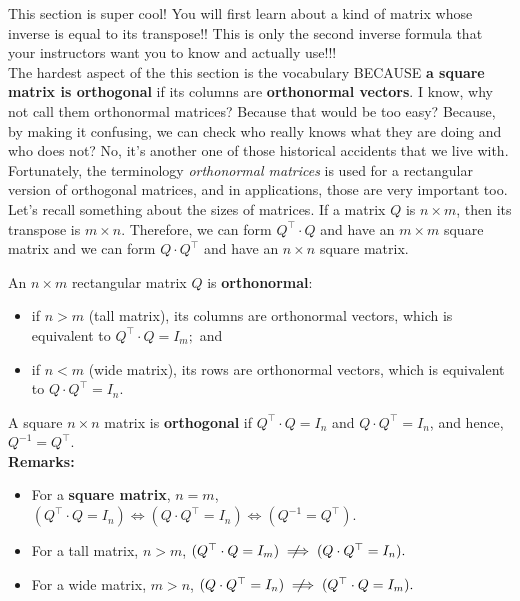 This section is super cool! You will first learn about a kind of matrix whose inverse is equal to its transpose!! This is only the second inverse formula that your instructors want you to know and actually use!!!  \\

The hardest aspect of the this section is the vocabulary BECAUSE \textbf{a square matrix is orthogonal} if its columns are \textbf{orthonormal vectors}. I know, why not call them orthonormal matrices? Because that would be too easy? Because, by making it confusing, we can check who really knows what they are doing and who does not? No, it's another one of those historical accidents that we live with. Fortunately, the terminology \textit{orthonormal matrices} is used for a rectangular version of orthogonal matrices, and in applications, those are very important too.\\

Let's recall something about the sizes of matrices. If a matrix $Q$ is $n \times m$, then its transpose is $m \times n$. Therefore, we can form $Q^\top \cdot Q$ and have an $m \times m$ square matrix and we can form  $Q \cdot Q^\top$ and have an $n \times n$ square matrix.

\vspace*{0.2cm}
\begin{tcolorbox}[sharp corners, colback=green!30, colframe=green!80!blue, title=\textbf{\Large Orthonormal and Orthognal Matrices}]
An $n \times m$ rectangular matrix $Q$ is \textbf{orthonormal}: 
\begin{itemize}
    \item if $ n > m$ (tall matrix), its columns are orthonormal vectors, which is equivalent to $Q^\top \cdot Q = I_m;$ and
    \item if $ n < m$ (wide matrix), its rows are orthonormal vectors,  which is equivalent to $Q \cdot Q^\top = I_n.$
\end{itemize}
A square $n \times n$ matrix is \textbf{orthogonal} if $Q^\top \cdot Q = I_n$ and $Q \cdot Q^\top = I_n$, and hence, $Q^{-1} = Q^\top$.\\

\textbf{Remarks:} 
\begin{itemize}
    \item For a \textbf{square matrix}, $n =m$,  $(Q^\top \cdot Q = I_n) \iff (Q \cdot Q^\top = I_n) \iff (Q^{-1} = Q^\top). $
    \item For a tall matrix,  $n > m$, $(Q^\top \cdot Q = I_m) \notimplies (Q \cdot Q^\top = I_n).$
    \item For a wide matrix,  $m > n$, $ (Q \cdot Q^\top = I_n) \notimplies (Q^\top \cdot Q = I_m).$
\end{itemize}
\end{tcolorbox}

